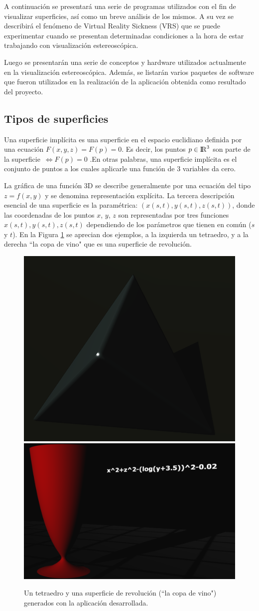 \documentclass[12pt]{article}
\begin{document}
A continuación se presentará una serie de programas utilizados con el fin de visualizar superficies, así como un breve análisis de los mismos. A su vez se describirá el fenómeno de Virtual Reality Sickness (VRS) que se puede experimentar cuando se presentan determinadas condiciones a la hora de estar trabajando con visualización estereoscópica.

Luego se presentarán una serie de conceptos y hardware utilizados actualmente en la visualización estereoscópica. Además, se listarán varios paquetes de software que fueron utilizados en la realización de la aplicación obtenida como resultado del proyecto.
\subsection{Tipos de superficies}
Una superficie implícita es una superficie en el espacio euclidiano definida por una ecuación $F (x, y, z) =  F(p) = 0$.  Es decir, los  puntos $ p \in {\rm I\!R} ^3$ son parte de la superficie~$ \iff F(p) = 0$ \cite{realtimerendering}.En otras palabras, una superficie implícita es el conjunto de puntos a los cuales aplicarle una función de 3 variables da cero. 

La gráfica de una función 3D se describe generalmente por una ecuación del tipo $z = f (x, y)$ y se denomina  representación explícita\cite{implicitas}\cite{realtimerendering}. La tercera descripción esencial de una superficie es la paramétrica: $(x(s, t), y (s, t), z (s, t))$, donde las coordenadas de los puntos $x$, $y$, $z$ son representadas por tres funciones $x(s, t), y(s, t) , z(s, t)$ dependiendo de los parámetros que tienen en común ($s$ y $t$). En la Figura \ref{ejemplosFiguras} se aprecian dos ejemplos, a la izquierda un tetraedro, y a la derecha ``la copa de vino" que es una superficie de revolución.
\begin{figure}[ht]
\includegraphics[width =0.45\linewidth]{tetraedro.png}
\hfill
\includegraphics[width =0.45\linewidth]{copa.png}
\caption{ Un tetraedro y una superficie de revolución (``la copa de vino") generados con la aplicación desarrollada.}
\label{ejemplosFiguras}
\end{figure}
\end{document}
